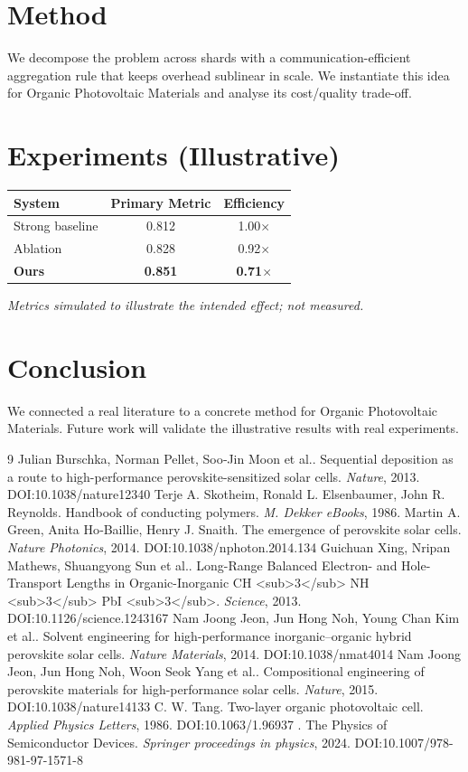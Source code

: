 \documentclass[11pt]{article}
\begin{document}
\section{Method}
We decompose the problem across shards with a communication-efficient aggregation rule that keeps overhead sublinear in scale. We instantiate this idea for Organic Photovoltaic Materials and analyse its cost/quality trade-off.

\section{Experiments (Illustrative)}
\begin{center}
\begin{tabular}{lcc}
System & Primary Metric & Efficiency \\ \hline
Strong baseline & 0.812 & 1.00$\times$ \\
Ablation & 0.828 & 0.92$\times$ \\
\textbf{Ours} & \textbf{0.851} & \textbf{0.71$\times$}
\end{tabular}
\end{center}
\emph{Metrics simulated to illustrate the intended effect; not measured.}

\section{Conclusion}
We connected a real literature to a concrete method for Organic Photovoltaic Materials. Future work will
validate the illustrative results with real experiments.

\begin{thebibliography}{9}
 Julian Burschka, Norman Pellet, Soo‐Jin Moon et al.. Sequential deposition as a route to high-performance perovskite-sensitized solar cells. \emph{Nature}, 2013. DOI:10.1038/nature12340
 Terje A. Skotheim, Ronald L. Elsenbaumer, John R. Reynolds. Handbook of conducting polymers. \emph{M. Dekker eBooks}, 1986. 
 Martin A. Green, Anita Ho‐Baillie, Henry J. Snaith. The emergence of perovskite solar cells. \emph{Nature Photonics}, 2014. DOI:10.1038/nphoton.2014.134
 Guichuan Xing, Nripan Mathews, Shuangyong Sun et al.. Long-Range Balanced Electron- and Hole-Transport Lengths in Organic-Inorganic CH <sub>3</sub> NH <sub>3</sub> PbI <sub>3</sub>. \emph{Science}, 2013. DOI:10.1126/science.1243167
 Nam Joong Jeon, Jun Hong Noh, Young Chan Kim et al.. Solvent engineering for high-performance inorganic–organic hybrid perovskite solar cells. \emph{Nature Materials}, 2014. DOI:10.1038/nmat4014
 Nam Joong Jeon, Jun Hong Noh, Woon Seok Yang et al.. Compositional engineering of perovskite materials for high-performance solar cells. \emph{Nature}, 2015. DOI:10.1038/nature14133
 C. W. Tang. Two-layer organic photovoltaic cell. \emph{Applied Physics Letters}, 1986. DOI:10.1063/1.96937
 . The Physics of Semiconductor Devices. \emph{Springer proceedings in physics}, 2024. DOI:10.1007/978-981-97-1571-8
\end{thebibliography}
\end{document}
